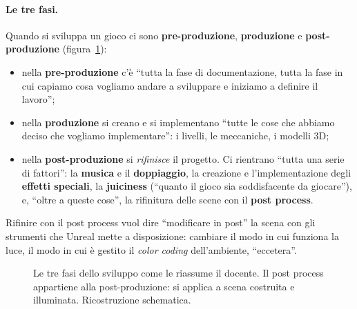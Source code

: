 \paragraph{Le tre fasi.} Quando si sviluppa un gioco ci sono \textbf{pre-produzione},
\textbf{produzione} e \textbf{post-produzione} (figura~\ref{ue16:fig:fasi}):
\begin{itemize}
  \item nella \textbf{pre-produzione} c'è ``tutta la fase di documentazione, tutta la fase in
        cui capiamo cosa vogliamo andare a sviluppare e iniziamo a definire il lavoro'';
  \item nella \textbf{produzione} si creano e si implementano ``tutte le cose che abbiamo
        deciso che vogliamo implementare'': i livelli, le meccaniche, i modelli 3D;
  \item nella \textbf{post-produzione} si \emph{rifinisce} il progetto. Ci rientrano ``tutta
        una serie di fattori'': la \textbf{musica} e il \textbf{doppiaggio}, la creazione e
        l'implementazione degli \textbf{effetti speciali}, la \textbf{juiciness} (``quanto il
        gioco sia soddisfacente da giocare''), e, ``oltre a queste cose'', la rifinitura delle
        scene con il \textbf{post process}.
\end{itemize}
Rifinire con il post process vuol dire ``modificare in post'' la scena con gli strumenti che
Unreal mette a disposizione: cambiare il modo in cui funziona la luce, il modo in cui è
gestito il \emph{color coding} dell'ambiente, ``eccetera''.

\begin{figure}[htbp]
\centering
{}
\caption{Le tre fasi dello sviluppo come le riassume il docente. Il post process appartiene
alla post-produzione: si applica a scena costruita e illuminata. Ricostruzione schematica.}
\label{ue16:fig:fasi}
\end{figure}

